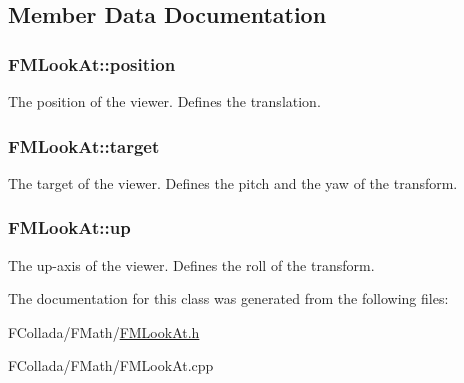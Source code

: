 \subsection{Member Data Documentation}
\hypertarget{classFMLookAt_ac6a935d152b60654e88e0d1eca5eaf75}{
\subsubsection[{position}]{ {\bf FMLookAt::position}}}
\label{classFMLookAt_ac6a935d152b60654e88e0d1eca5eaf75}
The position of the viewer. Defines the translation. \hypertarget{classFMLookAt_a1921262a8c2d6074189fc9b3c4da2dcf}{
\subsubsection[{target}]{ {\bf FMLookAt::target}}}
\label{classFMLookAt_a1921262a8c2d6074189fc9b3c4da2dcf}
The target of the viewer. Defines the pitch and the yaw of the transform. \hypertarget{classFMLookAt_aad5d1c7f21b35add5956972669befd6e}{
\subsubsection[{up}]{ {\bf FMLookAt::up}}}
\label{classFMLookAt_aad5d1c7f21b35add5956972669befd6e}
The up-\/axis of the viewer. Defines the roll of the transform. 

The documentation for this class was generated from the following files:\begin{DoxyCompactItemize}
\item 
FCollada/FMath/\hyperlink{FMLookAt_8h}{FMLookAt.h}\item 
FCollada/FMath/FMLookAt.cpp\end{DoxyCompactItemize}
